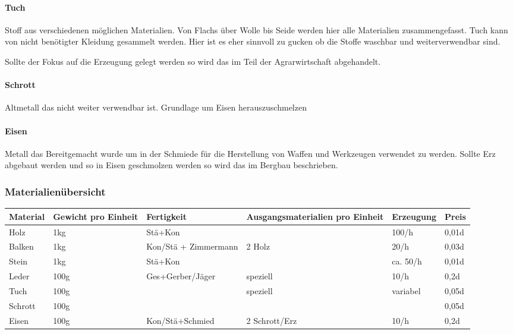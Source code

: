 \documentclass{article}
\begin{document}
\paragraph{Tuch}

Stoff aus verschiedenen möglichen Materialien. Von Flachs über Wolle bis Seide werden hier alle Materialien
zusammengefasst. Tuch kann von nicht benötigter Kleidung gesammelt werden. Hier ist es eher sinnvoll zu gucken
ob die Stoffe waschbar und weiterverwendbar sind.

Sollte der Fokus auf die Erzeugung gelegt werden so wird das im Teil der Agrarwirtschaft abgehandelt.

\paragraph{Schrott}

Altmetall das nicht weiter verwendbar ist. Grundlage um Eisen herauszuschmelzen

\paragraph{Eisen}

Metall das Bereitgemacht wurde um in der Schmiede für die Herstellung von Waffen und Werkzeugen verwendet zu werden.
Sollte Erz abgebaut werden und so in Eisen geschmolzen werden so wird das im Bergbau beschrieben.

\subsubsection{Materialienübersicht}


\begin{small}
\begin{tabular}{|m{15mm}|m{20mm}|m{4cm}|m{35mm}|m{2cm}|m{1cm}|}
\hline
\textbf{Material}&\textbf{Gewicht pro Einheit}&\textbf{Fertigkeit}&\textbf{Ausgangsmaterialien pro Einheit}&\textbf{Erzeugung}&\textbf{Preis}\\
\hline
\hline
Holz&1kg&Stä+Kon&&100/h&0,01d\\
\hline
Balken&1kg&Kon/Stä + Zimmermann&2 Holz&20/h&0,03d\\
\hline
Stein&1kg&Stä+Kon&&ca. 50/h&0,01d\\
\hline
Leder&100g&Ges+Gerber/Jäger&speziell&10/h&0,2d\\
\hline
Tuch&100g&&speziell&variabel&0,05d\\
\hline
Schrott&100g&&&&0,05d\\
\hline
Eisen&100g&Kon/Stä+Schmied&2 Schrott/Erz&10/h&0,2d\\
\hline
\end{tabular}
\end{small}
\end{document}
